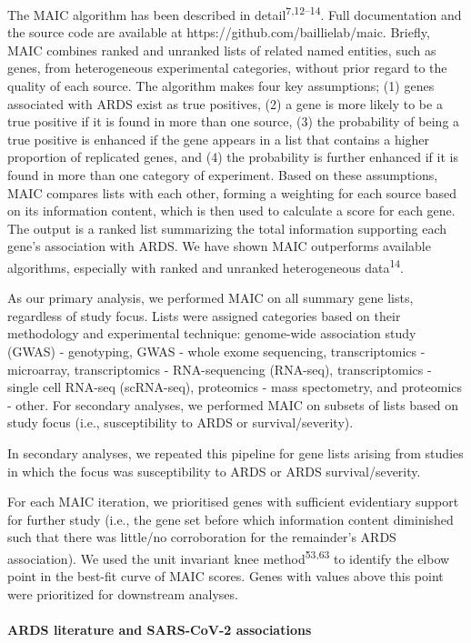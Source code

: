 \documentclass[
  11,
  a4paper,
]{article}
\let\oldparagraph\paragraph
\renewcommand{\paragraph}[1]{\oldparagraph{#1}\mbox{}}
\begin{document}
The MAIC algorithm has been described in
detail\textsuperscript{7,12--14}. Full documentation and the source code
are available at https://github.com/baillielab/maic. Briefly, MAIC
combines ranked and unranked lists of related named entities, such as
genes, from heterogeneous experimental categories, without prior regard
to the quality of each source. The algorithm makes four key assumptions;
(1) genes associated with ARDS exist as true positives, (2) a gene is
more likely to be a true positive if it is found in more than one
source, (3) the probability of being a true positive is enhanced if the
gene appears in a list that contains a higher proportion of replicated
genes, and (4) the probability is further enhanced if it is found in
more than one category of experiment. Based on these assumptions, MAIC
compares lists with each other, forming a weighting for each source
based on its information content, which is then used to calculate a
score for each gene. The output is a ranked list summarizing the total
information supporting each gene's association with ARDS. We have shown
MAIC outperforms available algorithms, especially with ranked and
unranked heterogeneous data\textsuperscript{14}.

As our primary analysis, we performed MAIC on all summary gene lists,
regardless of study focus. Lists were assigned categories based on their
methodology and experimental technique: genome-wide association study
(GWAS) - genotyping, GWAS - whole exome sequencing, transcriptomics -
microarray, transcriptomics - RNA-sequencing (RNA-seq), transcriptomics
- single cell RNA-seq (scRNA-seq), proteomics - mass spectometry, and
proteomics - other. For secondary analyses, we performed MAIC on subsets
of lists based on study focus (i.e., susceptibility to ARDS or
survival/severity).

In secondary analyses, we repeated this pipeline for gene lists arising
from studies in which the focus was susceptibility to ARDS or ARDS
survival/severity.

For each MAIC iteration, we prioritised genes with sufficient
evidentiary support for further study (i.e., the gene set before which
information content diminished such that there was little/no
corroboration for the remainder's ARDS association). We used the unit
invariant knee method\textsuperscript{53,63} to identify the elbow point
in the best-fit curve of MAIC scores. Genes with values above this point
were prioritized for downstream analyses.

\hypertarget{ards-literature-and-sars-cov-2-associations}{%
\paragraph{ARDS literature and SARS-CoV-2
associations}\label{ards-literature-and-sars-cov-2-associations}}
\end{document}
